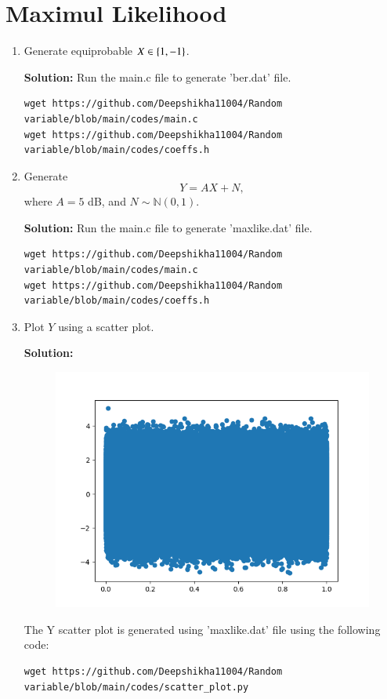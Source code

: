 \documentclass[journal,12pt,twocolumn]{IEEEtran}
\renewcommand\thesection{\arabic{section}}
\begin{document}
\section{Maximul Likelihood}
\begin{enumerate}[label=\thesection.\arabic*
,ref=\thesection.\theenumi]
\item Generate equiprobable $X \in \left\{1,-1\right\}$.


\textbf{Solution:}
Run the main.c file to generate 'ber.dat' file.
\begin{lstlisting}
wget https://github.com/Deepshikha11004/Random variable/blob/main/codes/main.c
wget https://github.com/Deepshikha11004/Random variable/blob/main/codes/coeffs.h
\end{lstlisting}
\item Generate 
\begin{equation}
Y = AX+N,
\end{equation}
where $A = 5$ dB,  and $N \sim \mathbb{N}(0, 1)$.

\textbf{Solution:}
Run the main.c file to generate 'maxlike.dat' file.
\begin{lstlisting}
wget https://github.com/Deepshikha11004/Random variable/blob/main/codes/main.c
wget https://github.com/Deepshikha11004/Random variable/blob/main/codes/coeffs.h
\end{lstlisting}
	\item Plot $Y$ using a scatter plot.
	
	
\textbf{Solution:}
\begin{figure}[!ht]
    \centering
    \includegraphics[width=\columnwidth]
    {Y_scatter.png}
    \caption{}
    \label{fig3}
\end{figure}
The Y scatter plot is generated using 'maxlike.dat' file using the following code:
\begin{lstlisting}
wget https://github.com/Deepshikha11004/Random variable/blob/main/codes/scatter_plot.py
\end{lstlisting}



\end{enumerate}
\end{document}
